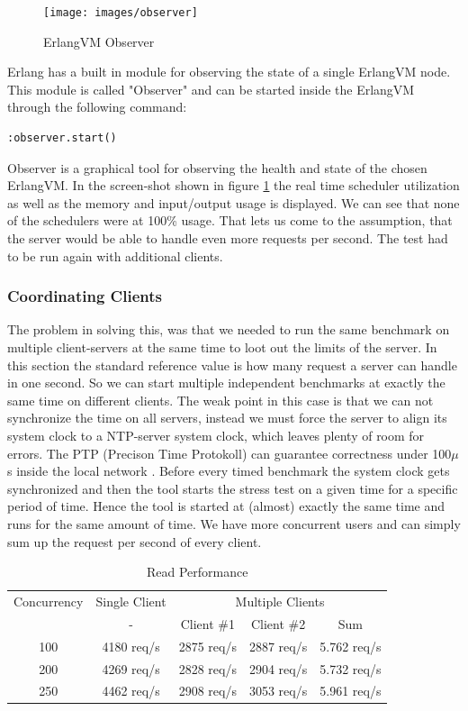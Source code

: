 \begin{figure}[H]
  \caption{ErlangVM Observer}
  \label{observer}
    \texttt{[image: images/observer]}
\end{figure}

{\color{newcode}
Erlang has a built in module for observing the state of a single ErlangVM node. This module is called "Observer" and can be started inside the ErlangVM through the following command:
\begin{lstlisting}
:observer.start()
\end{lstlisting}
 Observer is a graphical tool for observing the health and state of the chosen ErlangVM. In the screen-shot shown in figure \ref{observer} the real time scheduler utilization as well as the memory and input/output usage is displayed. We can see that none of the schedulers were at 100\% usage. That lets us come to the assumption, that the server would be able to handle even more requests per second. The test had to be run again with additional clients.}
 
\subsubsection{Coordinating Clients}\label{coordClie}
{\color{newcode}The problem in solving this, was that we needed to run the same benchmark on multiple client-servers at the same time to loot out the limits of the server. In this section the standard reference value is how many request a server can handle in one second. So we can start multiple independent benchmarks at exactly the same time on different clients. The weak point in this case is that we can not synchronize the time on all servers, instead we must force the server to align its system clock to a NTP-server system clock, which leaves plenty of room for errors. The PTP (Precison Time Protokoll) can guarantee correctness under 100$\mu$s inside the local network \cite{PTP}. Before every timed benchmark the system clock gets synchronized and then the tool starts the stress test on a given time for a specific period of time. Hence the tool is started at (almost) exactly the same time and runs for the same amount of time. We have more concurrent users and can simply sum up the request per second of every client. 
} \newline

\begin{table}
 \caption{Read Performance}
\begin{tabular}{c||c|ccc}

Concurrency & Single Client  & \multicolumn{3}{c}{Multiple Clients} \\ 
 & - & Client \#1 & Client \#2 & Sum  \\ 
\hline 
100 & 4180 req/s &  2875 req/s & 2887  req/s& 5.762 req/s \\ 
\hline 
200 & 4269 req/s & 2828 req/s & 2904  req/s& 5.732 req/s \\ 
\hline 
250 & 4462 req/s & 2908 req/s & 3053  req/s& 5.961 req/s \\ 
 
\end{tabular} 
\end{table}

